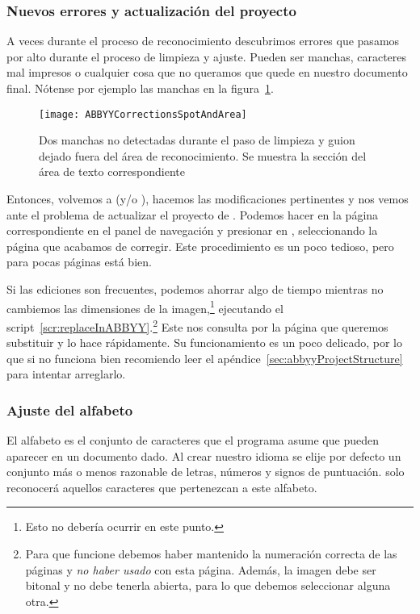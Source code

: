 \documentclass[%
	a5paper,
	10pt,
	twoside,
	openright,
	final,
]{memoir}
\begin{document}
{	\subsubsection{Nuevos errores y actualización del proyecto\label{sec:ABBYYCorrectionsSpotAndArea}} A veces durante el proceso de reconocimiento descubrimos errores que pasamos por alto durante el proceso de limpieza y ajuste. Pueden ser manchas, caracteres mal impresos o cualquier cosa que no queramos que quede en nuestro documento final. Nótense por ejemplo las manchas en la figura~\ref{fig:ABBYYCorrectionsSpotAndArea}.

	\begin{figure}
		\texttt{[image: ABBYYCorrectionsSpotAndArea]}
		\caption[Dos manchas y guion fuera del área de reconocimiento]{Dos manchas no detectadas durante el paso de limpieza y guion dejado fuera del área de reconocimiento. Se muestra la sección del área de texto correspondiente\label{fig:ABBYYCorrectionsSpotAndArea}}
	\end{figure}

	Entonces, volvemos a \scantailor (y/o \gimp), hacemos las modificaciones pertinentes y nos vemos ante el problema de actualizar el proyecto de \abbyy. Podemos hacer  en la página correspondiente en el panel de navegación y presionar en , seleccionando la página que acabamos de corregir. Este procedimiento es un poco tedioso, pero para pocas páginas está bien.

	Si las ediciones son frecuentes, podemos ahorrar algo de tiempo mientras no cambiemos las dimensiones de la imagen,\footnote{Esto no debería ocurrir en este punto.} ejecutando el script~\ref{scr:replaceInABBYY}.\footnote{Para que funcione debemos haber mantenido la numeración correcta de las páginas y \emph{no haber usado}  con esta página. Además, la imagen debe ser bitonal y \abbyy no debe tenerla abierta, para lo que debemos seleccionar alguna otra.} Este nos consulta por la página que queremos substituir y lo hace rápidamente. Su funcionamiento es un poco delicado, por lo que si no funciona bien recomiendo leer el apéndice~\ref{sec:abbyyProjectStructure} para intentar arreglarlo.


	\subsubsection{Ajuste del alfabeto} El alfabeto es el conjunto de caracteres que el programa asume que pueden aparecer en un documento dado. Al crear nuestro idioma se elije por defecto un conjunto más o menos razonable de letras, números y signos de puntuación. \abbyy solo reconocerá aquellos caracteres que pertenezcan a este alfabeto.

}
\end{document}
